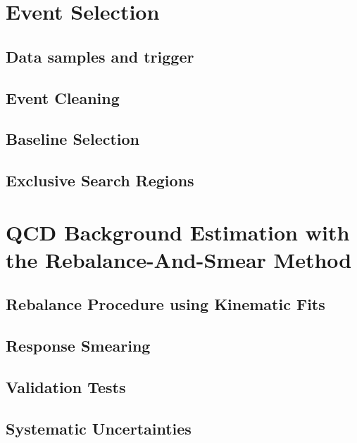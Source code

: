 \section{Event Selection}
\label{sec:RA2_sel}

\subsection{Data samples and trigger}
\label{subsec:RA2_samples_trigger}

\subsection{Event Cleaning}
\label{subsec:RA2_cleaning}

\subsection{Baseline Selection}
\label{subsec:RA2_baseline}

\subsection{Exclusive Search Regions}
\label{subsec:RA2_search_regions}

\section{QCD Background Estimation with the Rebalance-And-Smear Method}
\label{subsec:RA2_QCD}

\subsection{Rebalance Procedure using Kinematic Fits}
\label{subsec:RA2_reb}

\subsection{Response Smearing}
\label{subsec:RA2_smear}

\subsection{Validation Tests}
\label{subsec:RA2_clsoure}

\subsection{Systematic Uncertainties}
\label{subsec:RA2_syst_unc}

